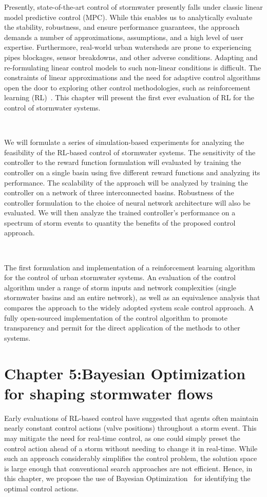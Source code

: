 Presently, state-of-the-art control of stormwater presently falls under classic linear model predictive control (MPC).
While this enables us to analytically evaluate the stability, robustness, and ensure performance guarantees, the approach demands a number of approximations, assumptions, and a high level of user expertise.
Furthermore, real-world urban watersheds are prone to experiencing pipes blockages, sensor breakdowns, and other adverse conditions.
Adapting and re-formulating linear control models to such non-linear conditions is difficult.
The constraints of linear approximations and the need for adaptive control algorithms open the door to exploring other control methodologies, such as reinforcement learning (RL)~\cite{Mnih2015}.
This chapter will present the first ever evaluation of RL for the control of stormwater systems.

\

We will formulate a series of simulation-based experiments for analyzing the feasibility of the RL-based control of stormwater systems.
The sensitivity of the controller to the reward function formulation will evaluated by training the controller on a single basin using five different reward functions and analyzing its performance.
The scalability of the approach will be analyzed by training the controller on a network of three interconnected basins.
Robustness of the controller formulation to the choice of neural network architecture will also be evaluated.
We will then analyze the trained controller's performance on a spectrum of storm events to quantity the benefits of the proposed control approach.

\

The first formulation and implementation of a reinforcement learning algorithm for the control of urban stormwater systems.
An evaluation of the control algorithm under a range of storm inputs and network complexities (single stormwater basins and an entire network), as well as an equivalence analysis that compares the approach to the widely adopted system scale control approach.
A fully open-sourced implementation of the control algorithm to promote transparency and permit for the direct application of the methods to other systems.


\section{Chapter 5:Bayesian Optimization for shaping stormwater flows}

Early evaluations of RL-based control have suggested that  agents often maintain nearly constant control actions (valve positions) throughout a storm event.
This may mitigate the need for real-time control, as one could simply preset the control action ahead of a storm without needing to change it in real-time. 
While such an approach considerably simplifies the control problem, the solution space is large enough that conventional search approaches are not efficient.
Hence, in this chapter, we propose the use of Bayesian Optimization~\cite{frazier2018tutorial} for identifying the optimal control actions.

